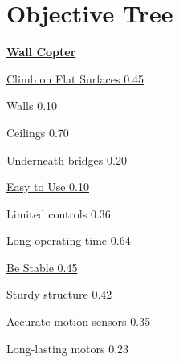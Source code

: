 \documentclass[12pt]{article}
\begin{document}
    \section{Objective Tree}
        \centerline{\Large \underline{\textbf{Wall Copter}}}
        \begin{multicols}{3}
            \noindent\underline{Climb on Flat Surfaces 0.45}
            
            \noindent Walls 0.10
            
            \noindent Ceilings 0.70
            
            \noindent Underneath bridges 0.20

            \columnbreak

            \noindent\underline{Easy to Use 0.10}

            \noindent Limited controls 0.36

            \noindent Long operating time 0.64

            \columnbreak
            
            \noindent\underline{Be Stable 0.45}
            
            \noindent Sturdy structure 0.42
            
            \noindent Accurate motion sensors 0.35
            
            \noindent Long-lasting motors 0.23

        \end{multicols}
    
    \newpage
\end{document}
